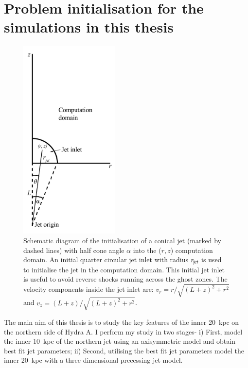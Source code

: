 \section{Problem initialisation for the simulations in this thesis}
\begin{figure}
\centering
\includegraphics[width=5cm]{cjt.png}
\caption{Schematic diagram of the initialisation of a conical jet (marked by dashed lines) with half cone angle $\alpha$ into the ($r, z$) computation domain. An initial quarter circular jet inlet with radius $r_{\rm jet}$ is used to initialise the jet in the computation domain. This initial jet inlet is useful to avoid reverse shocks running across the ghost zones. The velocity components inside the jet inlet are: $v_r = r/\sqrt{(L+z)^2+r^2}$ and $v_z = (L+z)/\sqrt{(L+z)^2+r^2}$. }
\label{f:cjt}
\end{figure}


The main aim of this thesis is to study the key features of the inner 20~kpc on the northern side of Hydra A. I perform my study in two stages- i) First, model the inner 10~kpc of the northern jet using an axisymmetric model and obtain best fit jet parameters; ii) Second, utilising the best fit jet parameters model the inner 20~kpc with a three dimensional precessing jet model. 

